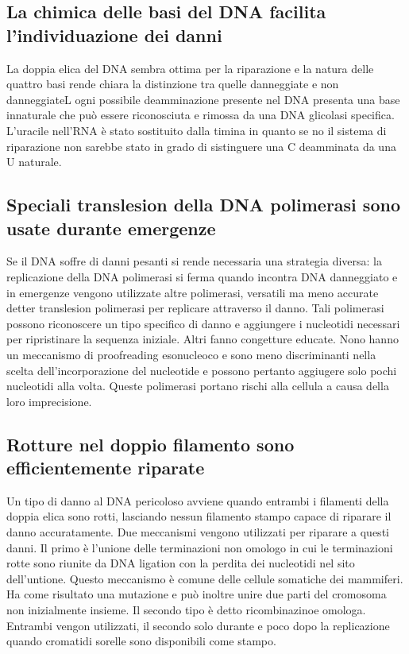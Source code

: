 \subsection{La chimica delle basi del DNA facilita l'individuazione dei danni}
La doppia elica del DNA sembra ottima per la riparazione e la natura delle quattro basi rende chiara la distinzione tra quelle danneggiate e non danneggiateL ogni possibile deamminazione
presente nel DNA presenta una base innaturale che pu\`o essere riconosciuta e rimossa da una DNA glicolasi specifica. L'uracile nell'RNA \`e stato sostituito dalla timina in quanto 
se no il sistema di riparazione non sarebbe stato in grado di sistinguere una C deamminata da una U naturale. 
\subsection{Speciali translesion della DNA polimerasi sono usate durante emergenze}
Se il DNA soffre di danni pesanti si rende necessaria una strategia diversa: la replicazione della DNA polimerasi si ferma quando incontra DNA danneggiato  e in emergenze vengono
utilizzate altre polimerasi, versatili ma meno accurate detter translesion polimerasi per replicare attraverso il danno. Tali polimerasi possono riconoscere un tipo specifico di danno 
e aggiungere i nucleotidi necessari per ripristinare la sequenza iniziale. Altri fanno congetture educate. Nono hanno un meccanismo di proofreading esonucleoco e sono 
meno discriminanti nella scelta dell'incorporazione del nucleotide e possono pertanto aggiugere solo pochi nucleotidi alla volta. Queste polimerasi portano rischi alla cellula a causa 
della loro imprecisione. 
\subsection{Rotture nel doppio filamento sono efficientemente riparate}
Un tipo di danno al DNA pericoloso avviene quando entrambi i filamenti della doppia elica sono rotti, lasciando nessun filamento stampo capace di riparare il danno accuratamente. Due
meccanismi vengono utilizzati per riparare a questi danni. Il primo \`e l'unione delle terminazioni non omologo in cui le terminazioni rotte sono riunite da DNA ligation con la 
perdita dei nucleotidi nel sito dell'untione. Questo meccanismo \`e comune delle cellule somatiche dei mammiferi. Ha come risultato una mutazione e pu\`o inoltre unire due parti 
del cromosoma non inizialmente insieme. Il secondo tipo \`e detto ricombinazinoe omologa. Entrambi vengon utilizzati, il secondo solo durante e poco dopo la replicazione quando cromatidi
sorelle sono disponibili come stampo. 
